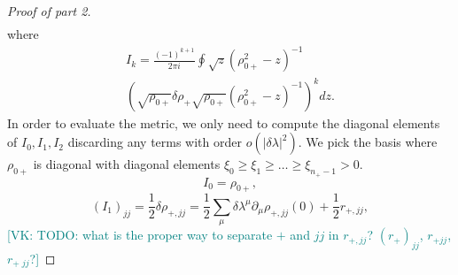 \documentclass[
  american,aps,pra,reprint,floatfix,nofootinbib,superscriptaddress
]{revtex4-2}
\newcommand{\abs}[1]{\left|#1\right|}
\newcommand{\VK}[1]{\textcolor{teal}{[VK: #1]}}
\begin{document}
\begin{proof}[Proof of part 2]
\begin{multline}
  \end{multline}
  where
  \begin{multline}
    I_k = \frac{(-1)^{k+1}}{2\pi i} \oint \sqrt{z}
    \left(\rho_{0{+}}^2 - z\right)^{-1}\\
    \left(\sqrt{\rho_{0{+}}} \delta \rho_{+} \sqrt{\rho_{0{+}}} \left(\rho_{0{+}}^2 - z\right)^{-1}\right)^{k} dz.
  \end{multline}
  In order to evaluate the metric, we only need to compute the diagonal elements
  of $I_0, I_1, I_2$ discarding any terms with order $o(\abs{\delta \lambda}^2)$.
  We pick the basis where $\rho_{0{+}}$ is diagonal with diagonal elements
  $\xi_0 \geq \xi_1 \geq \dots \geq \xi_{n_{+}-1} > 0$.
  \begin{equation}
    I_0 = \rho_{0{+}},
  \end{equation}
  \begin{equation}
    (I_1)_{jj} = \frac12 \delta \rho_{{+},jj}
    = \frac12 \sum_{\mu} \delta\lambda^{\mu} \partial_{\mu} \rho_{{+},jj}(0)
      + \frac12 r_{{+},jj},
  \end{equation}
  \VK{TODO: what is the proper way to separate ${+}$ and $jj$ in $r_{{+},jj}$?
  $(r_{+})_{jj}$, $r_{{+}jj}$, $r_{{+}\;jj}$?}


\end{proof}
\end{document}
